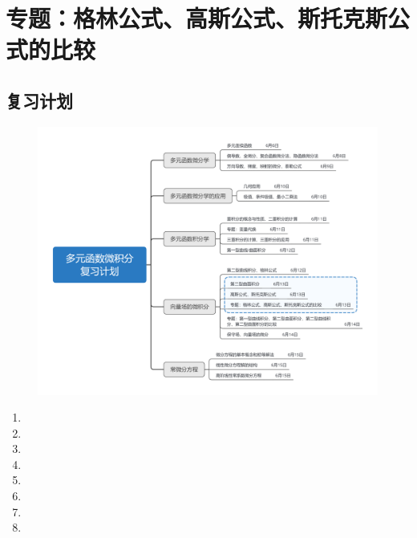 \documentclass[12pt,UTF8,fleqn]{ctexart}
\begin{document}
\setcounter{section}{12}
\section{专题：格林公式、高斯公式、斯托克斯公式的比较}
\noindent
\subsection{复习计划}
\begin{figure}[H]
\begin{center}
\includegraphics[height=0.5\textheight]{Figures20190613/plan.png}
\end{center}
\end{figure}
\begin{enumerate}
\item[]
\item[]
\item[]
\item[]
\item[]
\item[]
\item[]
\item[]
\end{enumerate}
\end{document}
